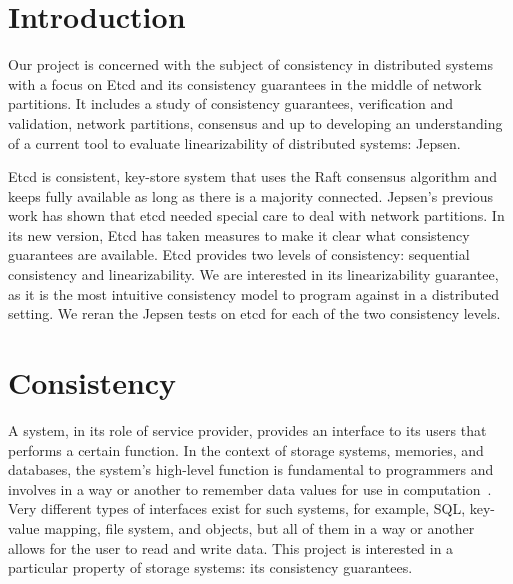 \documentclass[12pt,conference]{IEEEtran}
\begin{document}




%
\IEEEpeerreviewmaketitle



\section{Introduction}

Our project is concerned with the subject of consistency in distributed systems with a focus on Etcd and its consistency guarantees in the middle of network partitions. It includes a study of consistency guarantees, verification and validation, network partitions, consensus and up to developing an understanding of a current tool to evaluate linearizability of distributed systems: Jepsen.

Etcd is consistent, key-store system that uses the Raft consensus algorithm and keeps fully available as long as there is a majority connected. Jepsen’s previous work has shown that etcd needed special care to deal with network partitions. In its new version, Etcd has taken measures to make it clear what consistency guarantees are available. Etcd provides two levels of consistency: sequential consistency and linearizability. We are interested in its linearizability guarantee, as it is the most intuitive consistency model to program against in a distributed setting. We reran the Jepsen tests on etcd for each of the two consistency levels.

\section{Consistency}

A system, in its role of service provider, provides an interface to its users that performs a certain function. In the context of storage systems, memories, and databases, the system's high-level function is fundamental to programmers and involves in a way or another to remember data values for use in computation~\cite{saltzer2009principles}. Very different types of interfaces exist for such systems, for example, SQL, key-value mapping, file system, and objects, but all of them in a way or another allows for the user to read and write data. This project is interested in a particular property of storage systems: its consistency guarantees.
\end{document}
